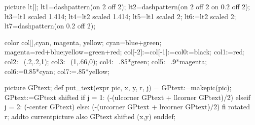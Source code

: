 picture lt[];
lt1=dashpattern(on 2 off 2); %
lt2=dashpattern(on 2 off 2 on 0.2 off 2); %
lt3=lt1 scaled 1.414;
lt4=lt2 scaled 1.414;
lt5=lt1 scaled 2;
lt6:=lt2 scaled 2;
lt7=dashpattern(on 0.2 off 2); %

color col[],cyan, magenta, yellow;
cyan=blue+green; magenta=red+blue;yellow=green+red;
col[-2]:=col[-1]:=col0:=black;
col1:=red;
col2:=(.2,.2,1); %
col3:=(1,.66,0); %
col4:=.85*green;
col5:=.9*magenta;
col6:=0.85*cyan;
col7:=.85*yellow;

picture GPtext;
def put_text(expr pic, x, y, r, j) =
  GPtext:=makepic(pic);
  GPtext:=GPtext shifted
    if j = 1: (-(ulcorner GPtext + llcorner GPtext)/2)
    elseif j = 2: (-center GPtext)
    else: (-(urcorner GPtext + lrcorner GPtext)/2)
    fi
    rotated r;
  addto currentpicture also GPtext shifted (x,y)
enddef;

